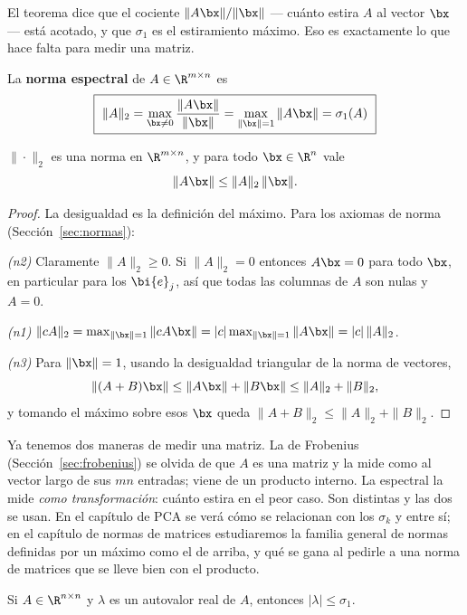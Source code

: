 El teorema dice que el cociente $\|A\bx\|/\|\bx\|$ --- cuánto estira $A$ al
vector $\bx$ --- está acotado, y que $\sigma_1$ es el estiramiento máximo. Eso
es exactamente lo que hace falta para medir una matriz.

\begin{definition}\label{def:norma-espectral}
La \textbf{norma espectral} de $A\in\R^{m\times n}$ es
\[
\boxed{\ \|A\|_2=\max_{\bx\neq0}\frac{\|A\bx\|}{\|\bx\|}
=\max_{\|\bx\|=1}\|A\bx\|=\sigma_1(A)\ }
\]
\end{definition}

\begin{proposition}\label{prop:espectral-norma}
$\|\cdot\|_2$ es una norma en $\R^{m\times n}$, y para todo $\bx\in\R^n$ vale
\[
\|A\bx\|\le\|A\|_2\,\|\bx\| .
\]
\end{proposition}

\begin{proof}
La desigualdad es la definición del máximo. Para los axiomas de norma
(Sección~\ref{sec:normas}):

\emph{(n2)} Claramente $\|A\|_2\ge0$. Si $\|A\|_2=0$ entonces $A\bx=0$ para
todo $\bx$, en particular para los $\bi{e}_j$, así que todas las columnas de $A$
son nulas y $A=0$.

\emph{(n1)} $\|cA\|_2=\max_{\|\bx\|=1}\|cA\bx\|=|c|\max_{\|\bx\|=1}\|A\bx\|
=|c|\,\|A\|_2$.

\emph{(n3)} Para $\|\bx\|=1$, usando la desigualdad triangular de la norma de
vectores,
\[
\|(A+B)\bx\|\le\|A\bx\|+\|B\bx\|\le\|A\|_2+\|B\|_2 ,
\]
y tomando el máximo sobre esos $\bx$ queda $\|A+B\|_2\le\|A\|_2+\|B\|_2$.
\end{proof}

\begin{remark}
Ya tenemos dos maneras de medir una matriz. La de Frobenius
(Sección~\ref{sec:frobenius}) se olvida de que $A$ es una matriz y la mide
como al vector largo de sus $mn$ entradas; viene de un producto interno. La
espectral la mide \emph{como transformación}: cuánto estira en el peor caso.
Son distintas y las dos se usan. En el capítulo de PCA se verá cómo se
relacionan con los $\sigma_k$ y entre sí; en el
capítulo de normas de matrices estudiaremos la familia general de normas
definidas por un máximo como el de arriba, y qué se gana al pedirle a una
norma de matrices que se lleve bien con el producto.
\end{remark}

\begin{corollary}\label{coro:lambda-sigma}
Si $A\in\R^{n\times n}$ y $\lambda$ es un autovalor real de $A$, entonces
$|\lambda|\le\sigma_1$.
\end{corollary}

